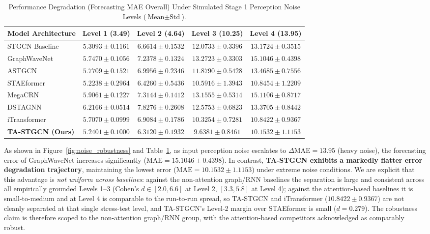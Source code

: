 \documentclass[a4paper,fleqn]{cas-sc}
\begin{document}
\begin{table}[pos=htbp]
\centering
\footnotesize
\setlength{\tabcolsep}{4pt}
\renewcommand{\arraystretch}{1.1}
\caption{Performance Degradation (Forecasting MAE Overall) Under Simulated Stage 1 Perception Noise Levels ($\text{Mean} \pm \text{Std}$).}
\label{tab:noise_robustness}
\begin{tabular}{lcccc}
\toprule
\textbf{Model Architecture} & \textbf{Level 1 (3.49)} & \textbf{Level 2 (4.64)} & \textbf{Level 3 (10.25)} & \textbf{Level 4 (13.95)} \\
\midrule
STGCN Baseline \cite{stgcn} & $5.3093 \pm 0.1161$ & $6.6614 \pm 0.1532$ & $12.0733 \pm 0.3396$ & $13.1724 \pm 0.3515$ \\
GraphWaveNet \cite{wavenet} & $5.7470 \pm 0.1056$ & $7.2378 \pm 0.1324$ & $13.2723 \pm 0.3303$ & $15.1046 \pm 0.4398$ \\
ASTGCN \cite{astgcn} & $5.7709 \pm 0.1521$ & $6.9956 \pm 0.2346$ & $11.8790 \pm 0.5428$ & $13.4685 \pm 0.7556$ \\
STAEformer \cite{staeformer} & $5.2238 \pm 0.2964$ & $6.4260 \pm 0.5436$ & $10.5916 \pm 1.3943$ & $10.8454 \pm 1.2209$ \\
MegaCRN \cite{megacrn} & $5.9061 \pm 0.1227$ & $7.3144 \pm 0.1412$ & $13.1555 \pm 0.5314$ & $15.1106 \pm 0.8717$ \\
DSTAGNN \cite{dstagnn} & $6.2166 \pm 0.0514$ & $7.8276 \pm 0.2608$ & $12.5753 \pm 0.6823$ & $13.3705 \pm 0.8442$ \\
iTransformer \cite{itransformer} & $5.7070 \pm 0.0999$ & $6.9084 \pm 0.1786$ & $10.3254 \pm 0.7281$ & $10.8422 \pm 0.9367$ \\
\midrule
\textbf{TA-STGCN (Ours)} & $\mathbf{5.2401 \pm 0.1000}$ & $\mathbf{6.3120 \pm 0.1932}$ & $\mathbf{9.6381 \pm 0.8461}$ & $\mathbf{10.1532 \pm 1.1153}$ \\
\bottomrule
\end{tabular}%
\end{table}

As shown in Figure~\ref{fig:noise_robustness} and Table~\ref{tab:noise_robustness}, as input perception noise escalates to $\Delta \text{MAE} = 13.95$ (heavy noise), the forecasting error of GraphWaveNet increases significantly ($\text{MAE} = 15.1046 \pm 0.4398$). In contrast, \textbf{TA-STGCN exhibits a markedly flatter error degradation trajectory}, maintaining the lowest error ($\text{MAE} = 10.1532 \pm 1.1153$) under extreme noise conditions. We are explicit that this advantage is \emph{not uniform across baselines}: against the non-attention graph/RNN baselines the separation is large and consistent across all empirically grounded Levels 1--3 (Cohen's $d \in [2.0, 6.6]$ at Level 2, $[3.3, 5.8]$ at Level 4); against the attention-based baselines it is small-to-medium and at Level 4 is comparable to the run-to-run spread, so TA-STGCN and iTransformer ($10.8422 \pm 0.9367$) are not cleanly separated at that single stress-test level, and TA-STGCN's Level-2 margin over STAEformer is small ($d = 0.279$). The robustness claim is therefore scoped to the non-attention graph/RNN group, with the attention-based competitors acknowledged as comparably robust.
\end{document}
